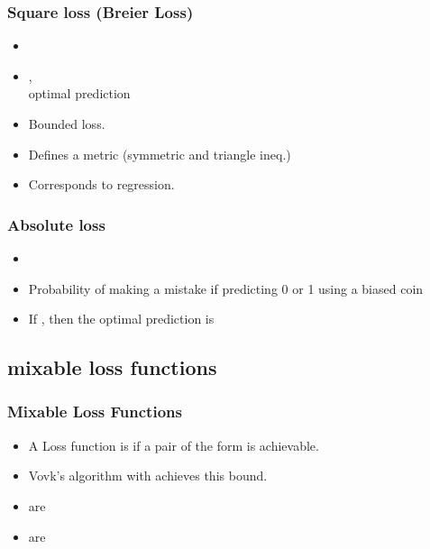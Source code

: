 \documentclass[handout]{beamer}
\begin{document}
\begin{frame}
\frametitle{Square loss (Breier Loss)}
\begin{itemize}
\item
\R{\[ \lambda_{\text{sq}}(\omega,\gamma)  = (\omega-\gamma)^2 \]}
\item
{}, \\
optimal prediction 
\item
Bounded loss.
\item
Defines a metric (symmetric and triangle ineq.)
\item
Corresponds to regression.
\end{itemize}
\end{frame}

\begin{frame}
\frametitle{Absolute loss}

\begin{itemize}
\item
\R{\[ \lambda(\omega,\gamma) = | \omega -\gamma | \]}
\item
Probability of making a mistake if predicting 0 or 1 
using a biased coin\\
\item
If , then the optimal prediction is 
\R{\[
\gamma^t = 
\begin{cases} 1 & \text{if $q>1/2$,} \\
              0 & \text{otherwise}
\end{cases}
\]}
\end{itemize}
\end{frame}

\subsection{mixable loss functions}
\begin{frame}
\frametitle{Mixable Loss Functions}
\begin{itemize}
\item A Loss function is  if a pair of the form  is achievable.
\item Vovk's algorithm with  achieves this bound.
\item {} are 
\item {} are 
\end{itemize}
\end{frame}
\end{document}
